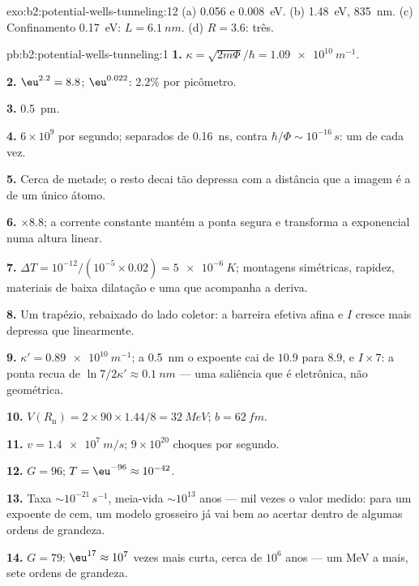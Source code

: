 \begin{solution}{exo:b2:potential-wells-tunneling:12}
(a) \qty{0.056}{} e \qty{0.008}{eV}. (b) \qty{1.48}{eV}, \qty{835}{nm}. (c) Confinamento
\qty{0.17}{eV}: $L = \qty{6.1}{nm}$. (d) $R = 3.6$: três.
\end{solution}

\begin{solution}{pb:b2:potential-wells-tunneling:1}
\textbf{1.} $\kappa = \sqrt{2m\Phi}/\hbar = \qty{1.09e10}{m^{-1}}$.

\textbf{2.} $\eu^{2.2} = 8.8$; $\eu^{0.022}$: $2.2\%$ por picômetro.

\textbf{3.} \qty{0.5}{pm}.

\textbf{4.} $6 \times 10^9$ por segundo; separados de \qty{0.16}{ns}, contra $\hbar/\Phi
\sim 10^{-16}\,\unit{s}$: um de cada vez.

\textbf{5.} Cerca de metade; o resto decai tão depressa com a distância que a
imagem é a de um único átomo.

\textbf{6.} $\times 8.8$; a corrente constante mantém a ponta segura e transforma
a exponencial numa altura linear.

\textbf{7.} $\Delta T = 10^{-12}/(10^{-5} \times 0.02) = \qty{5e-6}{K}$; montagens
simétricas, rapidez, materiais de baixa dilatação e uma  que acompanha a
deriva.

\textbf{8.} Um trapézio, rebaixado do lado coletor: a barreira efetiva
afina e $I$ cresce mais depressa que linearmente.

\textbf{9.} $\kappa' = \qty{0.89e10}{m^{-1}}$; a \qty{0.5}{nm} o expoente cai de
$10.9$ para $8.9$, e $I \times 7$: a ponta recua de $\ln 7/2\kappa' \approx \qty{0.1}{nm}$
--- uma saliência que é eletrônica, não geométrica.

\textbf{10.} $V(R_{\text{n}}) = 2 \times 90 \times 1.44/8 = \qty{32}{MeV}$; $b = \qty{62}{fm}$.

\textbf{11.} $v = \qty{1.4e7}{m/s}$; $9 \times 10^{20}$ choques por segundo.

\textbf{12.} $G = 96$; $T = \eu^{-96} \approx 10^{-42}$.

\textbf{13.} Taxa $\sim 10^{-21}\,\unit{s^{-1}}$, meia-vida $\sim 10^{13}$ anos --- mil
vezes o valor medido: para um expoente de cem, um modelo
grosseiro já vai bem ao acertar dentro de algumas ordens de grandeza.

\textbf{14.} $G = 79$: $\eu^{17} \approx 10^7$ vezes mais curta, cerca de $10^6$ anos ---
um MeV a mais, sete ordens de grandeza.


\end{solution}
